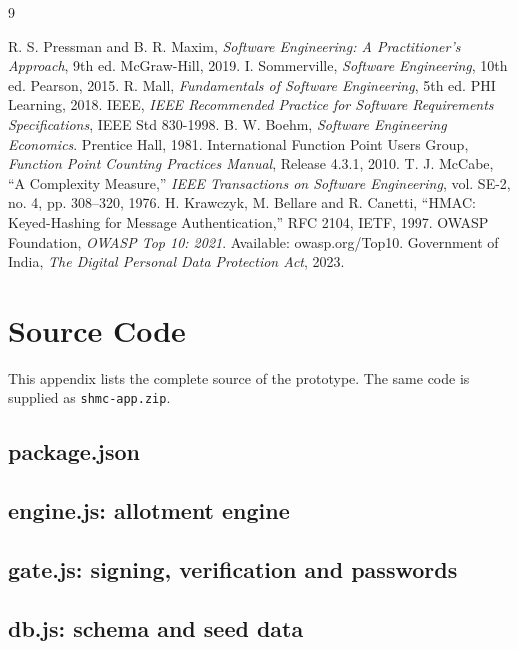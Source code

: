 \documentclass[11pt,a4paper]{report}
\begin{document}
\begin{thebibliography}{9}
 R. S. Pressman and B. R. Maxim, \emph{Software Engineering: A Practitioner's Approach}, 9th ed. McGraw-Hill, 2019.
 I. Sommerville, \emph{Software Engineering}, 10th ed. Pearson, 2015.
 R. Mall, \emph{Fundamentals of Software Engineering}, 5th ed. PHI Learning, 2018.
 IEEE, \emph{IEEE Recommended Practice for Software Requirements Specifications}, IEEE Std 830-1998.
 B. W. Boehm, \emph{Software Engineering Economics}. Prentice Hall, 1981.
 International Function Point Users Group, \emph{Function Point Counting Practices Manual}, Release 4.3.1, 2010.
 T. J. McCabe, ``A Complexity Measure,'' \emph{IEEE Transactions on Software Engineering}, vol. SE-2, no. 4, pp. 308--320, 1976.
 H. Krawczyk, M. Bellare and R. Canetti, ``HMAC: Keyed-Hashing for Message Authentication,'' RFC 2104, IETF, 1997.
 OWASP Foundation, \emph{OWASP Top 10: 2021}. Available: owasp.org/Top10.
 Government of India, \emph{The Digital Personal Data Protection Act}, 2023.
\end{thebibliography}


\appendix
\chapter{Source Code}\label{app:code}
This appendix lists the complete source of the prototype. The same code is supplied as \texttt{shmc-app.zip}.
\section{package.json}
\section{engine.js: allotment engine}
\section{gate.js: signing, verification and passwords}
\section{db.js: schema and seed data}
\end{document}
